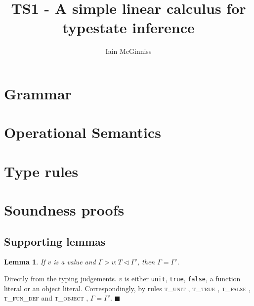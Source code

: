 \documentclass{article}
\newtheorem{lem}{Lemma}
\newcommand{\tunit}{\textsc{t\_unit} }
\newcommand{\ttrue}{\textsc{t\_true} }
\newcommand{\tfalse}{\textsc{t\_false} }
\newcommand{\tobj}{\textsc{t\_object} }
\newcommand{\tfundef}{\textsc{t\_fun\_def} }
\newcommand{\typerule}[4]{#1 \triangleright #2 : #3 \triangleleft #4}
\newcommand{\qed}{$\blacksquare$}
\newenvironment{proof}{\vspace{1ex}\noindent{\bf Proof}\hspace{0.5em}}
  {\hfill\qed\vspace{1ex}}
\begin{document}
\title{TS1 - A simple linear calculus for typestate inference}
\author{Iain McGinniss}

\section{Grammar}

\ottgrammartabular{
\ottt\ottinterrule
\ottv\ottinterrule
\otto\ottinterrule
\ottsv\ottinterrule
\ottT\ottinterrule
\ottO\ottinterrule
\ottst\ottinterrule
}

\section{Operational Semantics}

\ottgrammartabular{
\ottmu\ottinterrule
}

\ottdefnvalidstore

\ottdefnreduce

\section{Type rules}
\label{sec:typerules}

\ottgrammartabular{
\ottG\ottinterrule
\ottT\ottinterrule
}

\ottdefnvalidgamma

\ottdefnstoretype

\ottdefnmethtype

\ottdefnsubtype

\ottdefntype

\section{Soundness proofs}

\subsection{Supporting lemmas}

\begin{lem}
\label{lem:valuectx}
If $v$ is a value and $\typerule{\Gamma}{v}{T}{\Gamma'}$, then $\Gamma = \Gamma'$.
\end{lem}
\begin{proof}
Directly from the typing judgements. $v$ is either {\tt unit}, {\tt true},
{\tt false}, a function literal or an object literal.
Correspondingly, by rules \tunit,
\ttrue, \tfalse, 
\tfundef and \tobj, $\Gamma = \Gamma'$.
\end{proof}
\end{document}
